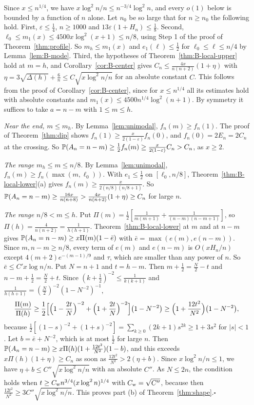 Since $x\le n^{1/4}$, we have $x\log^2n/n\le n^{-3/4}\log^2n$, and every
$o(1)$ below is bounded by a function of $n$ alone. Let $n_0$ be so large
that for $n\ge n_0$ the following hold. First, $\varepsilon\le\frac14$,
$n\ge1000$ and $13\varepsilon(1+H_n)\le\frac18$. Second,
$\ell_0\le m_1(x)\le4500x\log^2(x+1)\le n/8$, using Step 1 of the proof
of Theorem~\ref{thm:profile}. So $m_h\le m_1(x)$ and $e_1(\ell)\le\frac12$
for $\ell_0\le\ell\le n/4$ by Lemma~\ref{lem:B-mode}.
Third, the hypotheses of Theorem~\ref{thm:B-local-upper} hold at $m=h$,
and Corollary~\ref{cor:B-center} gives $C_n\le\frac{4x}{n(n+2)}(1+\eta)$
with $\eta=3\sqrt{\Delta(h)}+\frac6n\le C\sqrt{x\log^2n/n}$ for an absolute
constant $C$. This follows from the proof of Corollary~\ref{cor:B-center},
since for $x\le n^{1/4}$ all its estimates hold with absolute constants and
$m_1(x)\le4500n^{1/4}\log^2(n+1)$. By
symmetry it suffices to take $a=n-m$ with $1\le m\le h$.

\emph{Near the end, $m\le m_h$.} By Lemma~\ref{lem:unimodal},
$f_n(m)\ge f_n(1)$. The proof of Theorem~\ref{thm:dip} shows
$f_n(1)\ge\frac x{2(1-\varepsilon)}f_n(0)$, and $f_n(0)=2E_n=2C_n$ at the
crossing. So
$\mathbb{P}(A_n=n-m)\ge\frac12f_n(m)\ge\frac x{2(1-\varepsilon)}C_n>C_n$, as
$x\ge2$.

\emph{The range $m_h\le m\le n/8$.} By Lemma~\ref{lem:unimodal},
$f_n(m)\ge f_n(\max(m,\ell_0))$. With $e_1\le\frac12$ on $[\ell_0,n/8]$,
Theorem~\ref{thm:B-local-lower}(a) gives
$f_n(m)\ge\frac{x}{2(n/8)(n/8+1)}$. So
$\mathbb{P}(A_n=n-m)\ge\frac{16x}{n(n+8)}>\frac{4x}{n(n+2)}(1+\eta)\ge C_n$ for
large $n$.

\emph{The range $n/8<m\le h$.} Put
$\Pi(m)=\frac12[\frac1{m(m+1)}+\frac1{(n-m)(n-m+1)}]$, so
$\Pi(h)=\frac4{n(n+2)}=\frac1{h(h+1)}$. Theorem~\ref{thm:B-local-lower}
at $m$ and at $n-m$ gives $\mathbb{P}(A_n=n-m)\ge x\Pi(m)(1-\bar e)$ with
$\bar e=\max(e(m),e(n-m))$. Since $m,n-m\ge n/8$, every term of $e(m)$ and
$e(n-m)$ is $O(xH_n/n)$ except $4(m+2)e^{-(m-1)/9}$ and $\tau$, which are
smaller than any power of $n$. So $\bar e\le C'x\log n/n$. Put $N=n+1$ and
$t=h-m$. Then $m+\frac12=\frac N2-t$ and $n-m+\frac12=\frac N2+t$. Since
$(k+\frac12)^{-2}\le\frac1{k(k+1)}$ and $\frac1{h(h+1)}=(\frac N2)^{-2}(1-N^{-2})^{-1}$,
\[
 \frac{\Pi(m)}{\Pi(h)}\ge\frac12\Bigl[\Bigl(1-\frac{2t}N\Bigr)^{-2}+\Bigl(1+\frac{2t}N\Bigr)^{-2}\Bigr]\bigl(1-N^{-2}\bigr)
 \ge\Bigl(1+\frac{12t^2}{N^2}\Bigr)\bigl(1-N^{-2}\bigr),
\]
because $\frac12[(1-s)^{-2}+(1+s)^{-2}]=\sum_{k\ge0}(2k+1)s^{2k}\ge1+3s^2$
for $\lvert s\rvert<1$. Let $b=\bar e+N^{-2}$, which is at most $\frac12$
for large $n$. Then
$\mathbb{P}(A_n=n-m)\ge x\Pi(h)(1+\frac{12t^2}{N^2})(1-b)$, and this exceeds
$x\Pi(h)(1+\eta)\ge C_n$ as soon as $\frac{12t^2}{N^2}>2(\eta+b)$. Since
$x\log^2n/n\le1$, we have $\eta+b\le C''\sqrt{x\log^2n/n}$ with an absolute
$C''$. As $N\le2n$, the condition holds when
$t\ge C_{\rm w}n^{3/4}(x\log^2n)^{1/4}$ with $C_{\rm w}=\sqrt{C''}$, because then
$\frac{12t^2}{N^2}\ge3C''\sqrt{x\log^2n/n}$. This proves
part (b) of Theorem~\ref{thm:shape}.\hfill$\square$

